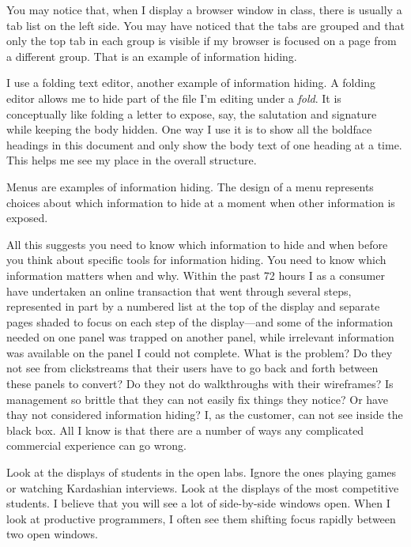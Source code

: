 You may notice that, when I display a browser window in class, there is
usually a tab list on the left side. You may have noticed that the tabs
are grouped and that only the top tab in each group is visible if my
browser is focused on a page from a different group. That is an example
of information hiding.

I use a folding text editor, another example of information hiding. A
folding editor allows me to hide part of the file I'm editing under a
\emph{fold}. It is conceptually like folding a letter to expose, say,
the salutation and signature while keeping the body hidden. One way I
use it is to show all the boldface headings in this document and only
show the body text of one heading at a time. This helps me see my place
in the overall structure.

Menus are examples of information hiding. The design of a menu
represents choices about which information to hide at a moment when
other information is exposed.

All this suggests you need to know which information to hide and when
before you think about specific tools for information hiding. You need
to know which information matters when and why. Within the past 72 hours
I as a consumer have undertaken an online transaction that went through
several steps, represented in part by a numbered list at the top of the
display and separate pages shaded to focus on each step of the
display---and some of the information needed on one panel was trapped on
another panel, while irrelevant information was available on the panel I
could not complete. What is the problem? Do they not see from
clickstreams that their users have to go back and forth between these
panels to convert? Do they not do walkthroughs with their wireframes? Is
management so brittle that they can not easily fix things they notice?
Or have thay not considered information hiding? I, as the customer, can
not see inside the black box. All I know is that there are a number of
ways any complicated commercial experience can go wrong.

\hypertarget{information-comparison}{%
\label{information-comparison}}

Look at the displays of students in the open labs. Ignore the ones
playing games or watching Kardashian interviews. Look at the displays of
the most competitive students. I believe that you will see a lot of
side-by-side windows open. When I look at productive programmers, I
often see them shifting focus rapidly between two open windows.

